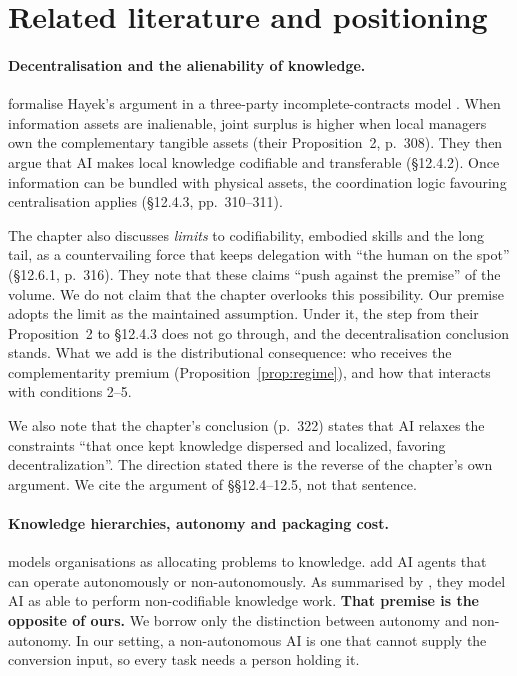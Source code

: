 \documentclass[12pt]{article}
\theoremstyle{remark}
\begin{document}
\section{Related literature and positioning}\label{sec:lit}

\paragraph{Decentralisation and the alienability of knowledge.} \citet{brynjolfsson2026hayek} formalise Hayek's argument \citep{hayek1945use} in a three-party incomplete-contracts model \citep{grossman1986costs,hart1990property}. When information assets are inalienable, joint surplus is higher when local managers own the complementary tangible assets (their Proposition~2, p.~308). They then argue that AI makes local knowledge codifiable and transferable (\S12.4.2). Once information can be bundled with physical assets, the coordination logic favouring centralisation applies (\S12.4.3, pp.~310--311).

The chapter also discusses \emph{limits} to codifiability, embodied skills and the long tail, as a countervailing force that keeps delegation with ``the human on the spot'' (\S12.6.1, p.~316). They note that these claims ``push against the premise'' of the volume. We do not claim that the chapter overlooks this possibility. Our premise adopts the limit as the maintained assumption. Under it, the step from their Proposition~2 to \S12.4.3 does not go through, and the decentralisation conclusion stands. What we add is the distributional consequence: who receives the complementarity premium (Proposition~\ref{prop:regime}), and how that interacts with conditions 2--5.

We also note that the chapter's conclusion (p.~322) states that AI relaxes the constraints ``that once kept knowledge dispersed and localized, favoring decentralization''. The direction stated there is the reverse of the chapter's own argument. We cite the argument of \S\S12.4--12.5, not that sentence.

\paragraph{Knowledge hierarchies, autonomy and packaging cost.} \citet{garicano2000hierarchies} models organisations as allocating problems to knowledge. \citet{ide2025knowledge} add AI agents that can operate autonomously or non-autonomously. As summarised by \citet[p.~179]{chatterji2026firms}, they model AI as able to perform non-codifiable knowledge work. \textbf{That premise is the opposite of ours.} We borrow only the distinction between autonomy and non-autonomy. In our setting, a non-autonomous AI is one that cannot supply the conversion input, so every task needs a person holding it.
\end{document}
